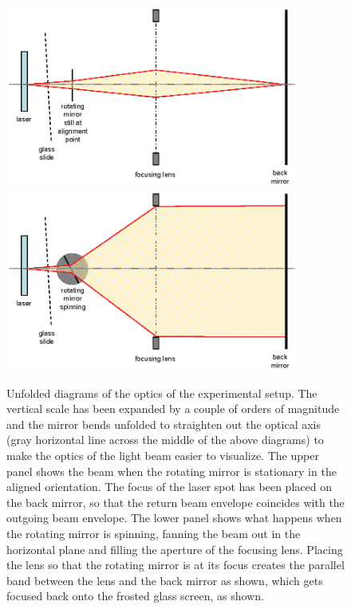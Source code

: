 \documentclass{revtex4}
\begin{document}
\begin{figure}
\includegraphics[width=3.8in]{clightoptics1.eps}
\includegraphics[width=3.8in]{clightoptics2.eps}
\caption{\label{clightoptics}
Unfolded diagrams of the optics of the experimental setup.  The vertical
scale has been expanded by a couple of orders of magnitude and the mirror
bends unfolded to straighten out the optical axis (gray horizontal line
across the middle of the above diagrams) to make the optics of the light
beam easier to visualize. 
The upper panel shows the beam when the rotating mirror is stationary in the
aligned orientation.  The focus of the laser spot has been placed on the back
mirror, so that the return beam envelope coincides with the outgoing beam 
envelope.  The lower panel shows what happens when the rotating mirror 
is spinning, fanning the beam out in the horizontal plane and filling the
aperture of the focusing lens.  Placing the lens so that the rotating mirror
is at its focus creates the parallel band between the lens and the back
mirror as shown, which gets focused back onto the frosted glass screen, as
shown.}
\end{figure}
\end{document}
